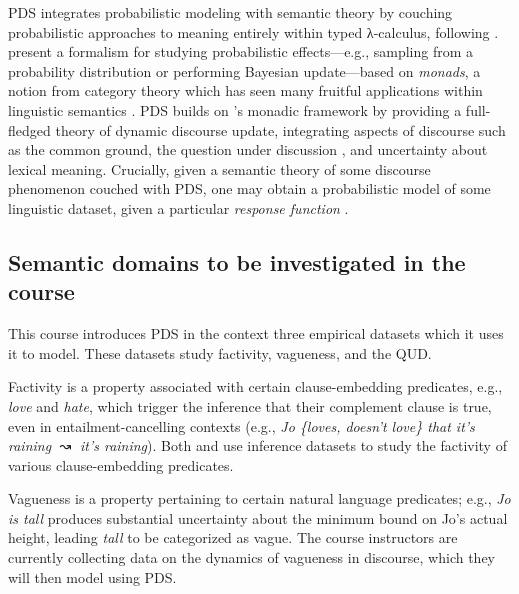 \documentclass[nobib,nohyper]{tufte-handout}
\begin{document}
PDS integrates probabilistic modeling with semantic theory by couching probabilistic approaches to meaning entirely within typed λ-calculus, following \cite{grove_probabilistic_2023}.
\citeauthor{grove_probabilistic_2023} present a formalism for studying probabilistic effects---e.g., sampling from a probability distribution or performing Bayesian update---based on \emph{monads}, a notion from category theory which has seen many fruitful applications within linguistic semantics \parencite[i.a.]{shan_monads_2002,charlow_semantics_2014,charlow_scope_2020}.
PDS builds on \citeauthor{grove_probabilistic_2023}'s monadic framework by providing a full-fledged theory of dynamic discourse update, integrating aspects of discourse such as the common ground, the question under discussion \parencite[QUD;][]{ginzburg_dynamics_1996,roberts_information_2012,farkas_reacting_2010}, and uncertainty about lexical meaning.
Crucially, given a semantic theory of some discourse phenomenon couched with PDS, one may obtain a probabilistic model of some linguistic dataset, given a particular \emph{response function} \parencite{grove_factivity_2024,grove_modeling_2025,grove_probabilistic_2024}. 

\subsection{Semantic domains to be investigated in the course}

This course introduces PDS in the context three empirical datasets which it uses it to model.
These datasets study factivity, vagueness, and the QUD.

Factivity is a property associated with certain clause-embedding predicates, e.g., \textit{love} and \textit{hate}, which trigger the inference that their complement clause is true, even in entailment-cancelling contexts (e.g., \textit{Jo \{loves, doesn't love\} that it's raining} \(↝\) \textit{it's raining}).
Both \textcite{grove_factivity_2024} and \textcite{grove_modeling_2025} use inference datasets to study the factivity of various clause-embedding predicates.

Vagueness is a property pertaining to certain natural language predicates;
e.g., \textit{Jo is tall} produces substantial uncertainty about the minimum bound on Jo's actual height, leading \textit{tall} to be categorized as vague.
The course instructors are currently collecting data on the dynamics of vagueness in discourse, which they will then model using PDS. 
\end{document}
